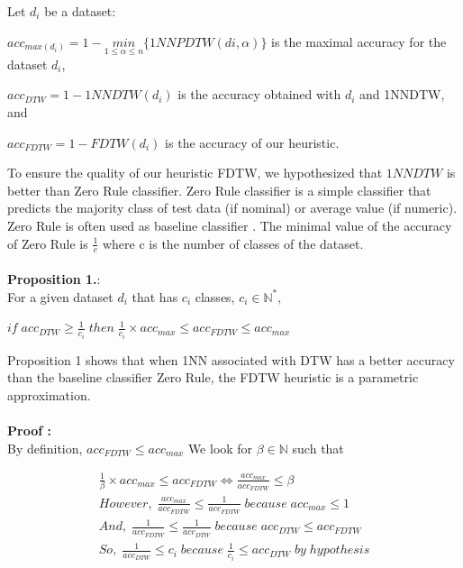 Let $d_i$ be a dataset: 

$acc_{max(d_i)} = 1-\underset{1\leq\alpha\leq
n}{min}\{1NNPDTW(di,\alpha)\}$ is the maximal accuracy for the dataset $d_i$,

$acc_{DTW} = 1 - 1NNDTW(d_i)$ is the accuracy obtained with $d_i$ and 1NNDTW, and


$acc_{FDTW}=1 - FDTW(d_i)$ is the accuracy of our heuristic.

To ensure the quality of our heuristic FDTW, we hypothesized that $1NNDTW$ is better than
Zero Rule classifier. Zero Rule classifier is a simple classifier that predicts the majority class of test data (if nominal) or average value (if numeric). Zero Rule is often
used as baseline classifier \cite{cuvrin2007meeting}. The minimal value of the
accuracy of Zero Rule is $\frac{1}{c}$ where c is the number of classes of the
dataset.

\paragraph{}\textbf{Proposition 1.}:\\
For a given dataset $d_i$ that has $c_i$ classes, $c_i\in \mathbb{N}^*,$

$
if \; acc_{DTW} \geq \frac{1}{c_i} \; then \;  \frac{1}{c_i} \times acc_{max}
\leq acc_{FDTW} \leq acc_{max}
$

Proposition 1 shows that when 1NN associated with DTW has a better accuracy than the baseline
classifier Zero Rule, the FDTW heuristic is a parametric approximation.

\paragraph{}\textbf{Proof : }\\
By definition, $ acc_{FDTW} \leq acc_{max}$ 
We look for $\beta \in \mathbb{N}$ such that 

\begin{eqnarray}
\frac{1}{\beta}\times acc_{max}\leq acc_{FDTW} \Leftrightarrow\frac{acc_{max}}{acc_{FDTW}}\leq \beta \\
However,\; \frac{acc_{max}}{acc_{FDTW}}\leq\frac{1} {acc_{FDTW}}\;because\; acc_{max}\leq 1 \\
And,\; \frac{1}{acc_{FDTW}}\leq\frac{1}{acc_{DTW}} \; because \; acc_{DTW}\leq acc_{FDTW} \\
So,\; \frac{1}{acc_{DTW}}\leq c_{i} \; because \; \frac{1}{c_{i}}\leq acc_{DTW} \; by \; hypothesis
\end{eqnarray}


